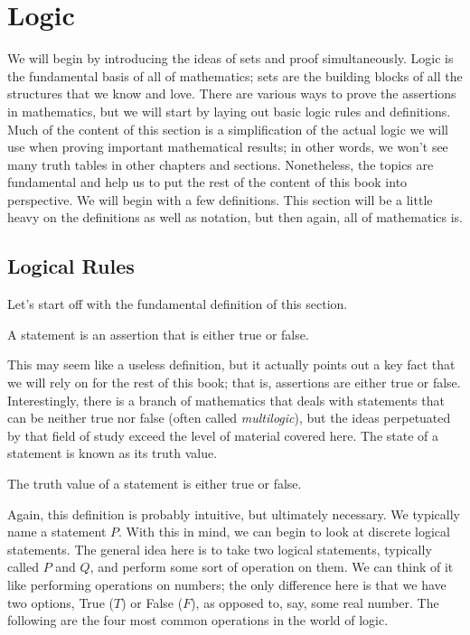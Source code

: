 \section{Logic}

We will begin by introducing the ideas of sets and proof simultaneously. Logic is the fundamental basis of all of mathematics; sets are the building blocks of all the structures that we know and love. There are various ways to prove the assertions in mathematics, but we will start by laying out basic logic rules and definitions. Much of the content of this section is a simplification of the actual logic we will use when proving important mathematical results; in other words, we won't see many truth tables in other chapters and sections. Nonetheless, the topics are fundamental and help us to put the rest of the content of this book into perspective. We will begin with a few definitions. This section will be a little heavy on the definitions as well as notation, but then again, all of mathematics is.

\subsection{Logical Rules}
Let's start off with the fundamental definition of this section.

\begin{definition}{}
	A statement is an assertion that is either true or false.
\end{definition}

This may seem like a useless definition, but it actually points out a key fact that we will rely on for the rest of this book; that is, assertions are either true or false. Interestingly, there is a branch of mathematics that deals with statements that can be neither true nor false (often called \textit{multilogic}), but the ideas perpetuated by that field of study exceed the level of material covered here. The state of a statement is known as its truth value.

\begin{definition}{}
	The truth value of a statement is either true or false.
\end{definition}

Again, this definition is probably intuitive, but ultimately necessary. We typically name a statement $P$. With this in mind, we can begin to look at discrete logical statements. The general idea here is to take two logical statements, typically called $P$ and $Q$, and perform some sort of operation on them. We can think of it like performing operations on numbers; the only difference here is that we have two options, True ($T$) or False ($F$), as opposed to, say, some real number. The following are the four most common operations in the world of logic.

